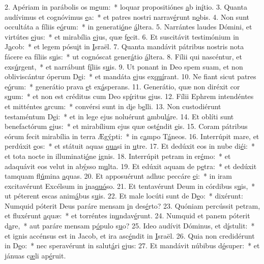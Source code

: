 2. Apériam in parábolis os m\uline{e}um:~* loquar propositiónes \uline{a}b in\uline{í}tio.
3. Quanta audívimus et cognóvimus \uline{e}a:~* et patres nostri narrav\uline{é}runt n\uline{o}bis.
4. Non sunt occultáta a fíliis e\uline{ó}rum:~* in generati\uline{ó}ne \uline{á}ltera.
5. Narrántes laudes Dómini, et virtútes \uline{e}jus:~* et mirabília \uline{e}jus, quæ f\uline{e}cit.
6. Et suscitávit testimónium in J\uline{a}cob:~* et legem pósu\uline{i}t in \uline{I}sraël.
7. Quanta mandávit pátribus nostris nota fácere ea fíliis s\uline{u}is:~* ut cognóscat gener\uline{á}tio \uline{á}ltera.
8. Fílii qui nascéntur, et exs\uline{ú}rgent,~* et narrábunt f\uline{í}liis s\uline{u}is.
9. Ut ponant in Deo spem suam, et non obliviscántur óperum D\uline{e}i:~* et mandáta \uline{e}jus ex\uline{quí}rant.
10. Ne fiant sicut patres e\uline{ó}rum:~* generátio prava \uline{e}t ex\uline{á}sperans.
11. Generátio, quæ non diréxit cor s\uline{u}um:~* et non est créditus cum Deo sp\uline{í}ritus \uline{e}jus.
12. Fílii Ephrem intendéntes et mitténtes \uline{a}rcum:~* convérsi sunt in d\uline{i}e b\uline{e}lli.
13. Non custodiérunt testaméntum D\uline{e}i:~* et in lege ejus noluérunt \uline{a}mbul\uline{á}re.
14. Et oblíti sunt benefactórum \uline{e}jus:~* et mirabílium ejus quæ ost\uline{é}ndit \uline{e}is.
15. Coram pátribus eórum fecit mirabília in terra Æg\uline{ý}pti:~* in c\uline{a}mpo T\uline{á}neos.
16. Interrúpit mare, et perdúxit \uline{e}os:~* et státuit aquas \uline{qua}si in \uline{u}tre.
17. Et dedúxit eos in nube di\uline{é}i:~* et tota nocte in illuminati\uline{ó}ne \uline{i}gnis.
18. Interrúpit petram in er\uline{é}mo:~* et adaquávit eos velut in ab\uline{ý}sso m\uline{u}lta.
19. Et edúxit aquam de p\uline{e}tra:~* et dedúxit tamquam fl\uline{ú}mina \uline{a}quas.
20. Et apposuérunt adhuc peccáre \uline{e}i:~* in iram excitavérunt Excélsum in \uline{i}na\uline{quó}so.
21. Et tentavérunt Deum in córdibus s\uline{u}is,~* ut péterent escas anim\uline{á}bus s\uline{u}is.
22. Et male locúti sunt de D\uline{e}o:~* dixérunt: Numquid póterit Deus paráre mensam \uline{i}n des\uline{é}rto?
23. Quóniam percússit petram, et fluxérunt \uline{a}quæ:~* et torréntes in\uline{u}ndav\uline{é}runt.
24. Numquid et panem póterit d\uline{a}re,~* aut paráre mensam p\uline{ó}pulo s\uline{u}o?
25. Ideo audívit Dóminus, et d\uline{í}stulit:~* et ignis accénsus est in Jacob, et ira asc\uline{é}ndit in \uline{I}sraël.
26. Quia non credidérunt in D\uline{e}o:~* nec speravérunt in salut\uline{á}ri \uline{e}jus:
27. Et mandávit núbibus d\uline{é}super:~* et jánuas c\uline{æ}li ap\uline{é}ruit.
